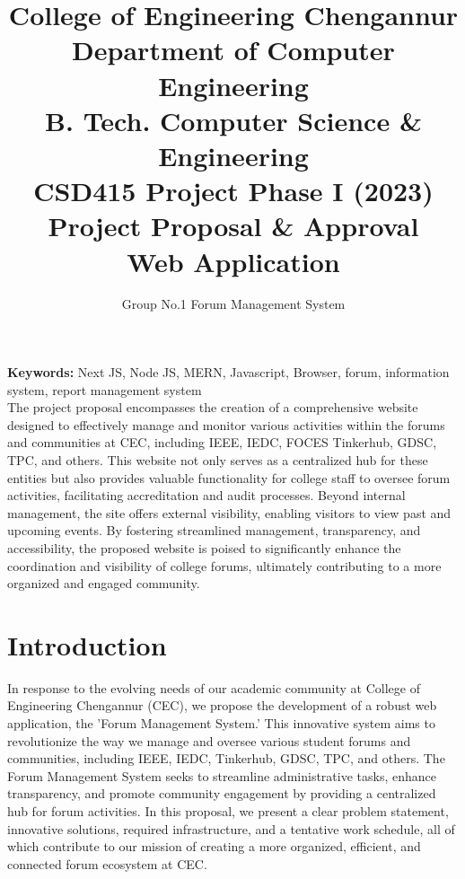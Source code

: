 \documentclass[twocolumn,10pt]{article}
\title{College of Engineering Chengannur
\\Department of Computer  Engineering
\\B. Tech. Computer Science \& Engineering 
\\CSD415 Project Phase I (2023)
\\ Project  Proposal \& Approval
\\ \bf{Web Application}
}
\author{Group No.1 Forum Management System }
\begin{document}
\maketitle

{\bf Keywords:} Next JS, Node JS, MERN, Javascript, Browser,
forum, information system, report
management system \\

\abstract{}
The project proposal encompasses the creation of a comprehensive website designed to effectively manage and monitor various activities within the forums and communities at CEC, including IEEE, IEDC, FOCES Tinkerhub, GDSC, TPC, and others. This website not only serves as a centralized hub for these entities but also provides valuable functionality for college staff to oversee forum activities, facilitating accreditation and audit processes. Beyond internal management, the site offers external visibility, enabling visitors to view past and upcoming events. By fostering streamlined management, transparency, and accessibility, the proposed website is poised to significantly enhance the coordination and visibility of college forums, ultimately contributing to a more organized and engaged community.\section{\label{intro}Introduction}
In response to the evolving needs of our academic community at College of Engineering Chengannur (CEC), we propose the development of a robust web application, the 'Forum Management System.' This innovative system aims to revolutionize the way we manage and oversee various student forums and communities, including IEEE, IEDC, Tinkerhub, GDSC, TPC, and others. The Forum Management System seeks to streamline administrative tasks, enhance transparency, and promote community engagement by providing a centralized hub for forum activities. In this proposal, we present a clear problem statement, innovative solutions, required infrastructure, and a tentative work schedule, all of which contribute to our mission of creating a more organized, efficient, and connected forum ecosystem at CEC.
\end{document}
